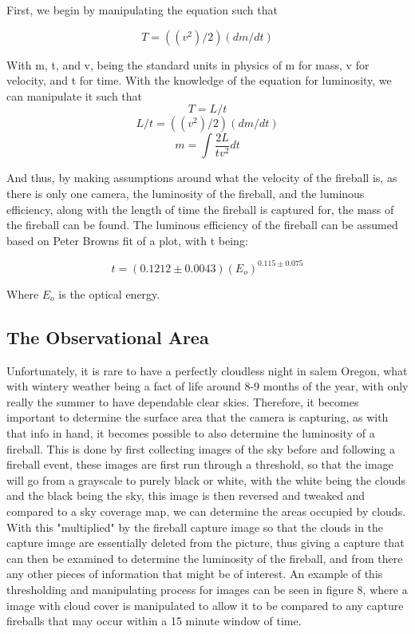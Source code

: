 First, we begin by manipulating the equation such that 

\begin{equation}
    T = ((v^2)/2)(dm/dt)
\end{equation}

With m, t, and v, being the standard units in physics of m for mass, v for velocity, and t for time.
With the knowledge of the equation for luminosity, we can manipulate it such that
\begin{equation}
    T = L/t
\end{equation}
\begin{equation}
    L/t=((v^2)/2)(dm/dt)
\end{equation}
\begin{equation}
    m=\int \frac{2L}{tv^2}dt
\end{equation}

And thus, by making assumptions around what the velocity of the fireball is, as there is only one camera, the luminosity of the fireball, and the luminous efficiency, along with the length of time the fireball is captured for, the mass of the fireball can be found.
The luminous efficiency of the fireball can be assumed based on Peter Browns fit of a plot, with t being\cite{PBrown2002}:

\begin{equation}
    t = (0.1212\pm 0.0043)(E_o)^{0.115\pm 0.075}
\end{equation}

Where $E_o$ is the optical energy.

\subsection{The Observational Area}

Unfortunately, it is rare to have a perfectly cloudless night in salem Oregon, what with wintery weather being a fact of life around 8-9 months of the year, with only really the summer to have dependable clear skies.
Therefore, it becomes important to determine the surface area that the camera is capturing, as with that info in hand, it becomes possible to also determine the luminosity of a fireball.
This is done by first collecting images of the sky before and following a fireball event, these images are first run through a threshold, so that the image will go from a grayscale to purely black or white, with the white being the clouds and the black being the sky, this image is then reversed and tweaked and compared to a sky coverage map, we can determine the areas occupied by clouds\cite{Gibson}. 
With this "multiplied" by the fireball capture image so that the clouds in the capture image are essentially deleted from the picture, thus giving a capture that can then be examined to determine the luminosity of the fireball, and from there any other pieces of information that might be of interest.
An example of this thresholding and manipulating process for images can be seen in figure 8, where a image with cloud cover is manipulated to allow it to be compared to any capture fireballs that may occur within a 15 minute window of time\cite{Gibson}.

